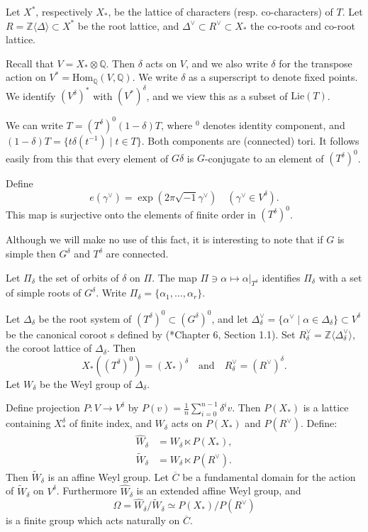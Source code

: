 \documentclass[10pt,leqno]{article}
\newcommand{\Hom}{\text{Hom}}
\newcommand{\Lie}{\text{Lie}}
\newcommand{\Z}{\mathbb Z}
\newcommand{\Q}{\mathbb Q}
\newcommand{\ch}[1]{#1^\vee}
\newcommand\inv{^{-1}}
\newcommand\wt{\widetilde}
\newcommand\wh{\widehat}
\begin{document}
Let $X^*$, respectively $X_*$, be the lattice of characters (resp. co-characters) of $T$.
Let $R=\Z\langle\Delta\rangle\subset X^*$ be
the root lattice, and $\ch\Delta\subset \ch R\subset X_*$ the co-roots and co-root lattice.

Recall that $V=X_*\otimes\Q$. Then $\delta$ acts on $V$, and we also write
$\delta$ for the transpose action on $V^*=\Hom_\Q(V,\Q)$.
We write $\delta$ as a superscript to denote fixed points.
We identify $(V^\delta)^*$ with $(V^*)^\delta$, and we view this as a subset of $\Lie(T)$.

We can write $T=(T^\delta)^0(1-\delta)T$, where $\phantom{}^0$ denotes identity component,
and $(1-\delta)T=\{t\delta(t\inv)\mid t\in T\}$. Both components are (connected) tori.
It follows easily from this that every element of $G\delta$ is $G$-conjugate
to an element of $(T^\delta)^0$.

Define
\begin{equation}
\label{e:e}
e(\ch\gamma)=\exp(2\pi \sqrt{-1}\ch\gamma) \quad(\ch\gamma\in V^\delta).
\end{equation}
This map is surjective  onto the elements of finite order in $(T^\delta)^0$.

Although we will make no use of this fact, it is interesting to note that if $G$ is simple then
$G^\delta$  and $T^\delta$ are connected.

Let $\Pi_\delta$ the set of orbits of $\delta$ on $\Pi$. The map
$\Pi\ni\alpha\mapsto \alpha|_{T^{\delta}}$ identifies $\Pi_\delta$ with 
a set of simple roots of 
$G^{\delta}$. Write $\Pi_\delta=\{\alpha_1,\dots,\alpha_r\}$.

Let $\Delta_\delta$ be the root system of
$(T^{\delta})^0\subset (G^{\delta})^0$, and let
$\ch\Delta_\delta=\{\ch\alpha\mid \alpha\in\Delta_\delta\}\subset
V^\delta$ be the canonical coroot
s defined by
(\cite{bourbaki_4-6}*{Chapter 6, Section 1.1}).
Set $\ch R_\delta=\Z\langle\ch\Delta_\delta\rangle$, the coroot lattice of $\Delta_\delta$.
Then
$$
X_*((T^{\delta})^0)=(X_*)^\delta\quad\text{and}\quad \ch R_\delta=(\ch R)^\delta.
$$
Let $W_\delta$ be the Weyl group of $\Delta_\delta$.

Define projection $P:V\rightarrow V^\delta$ by
$P(v)=\frac1n \sum_{i=0}^{n-1}\delta^iv$.
Then $P(X_*)$ is a lattice containing $X_*^\delta$ of finite index,
and $W_\delta$ acts on $P(X_*)$ and $P(\ch R)$. Define:
\begin{equation}
\label{e:affine}
\begin{aligned}
\wh W_\delta&=W_\delta\ltimes P(X_*), \\
\wt W_\delta&=W_\delta\ltimes P(\ch R).
\end{aligned}
\end{equation}
Then $\wt W_\delta$ is an affine Weyl group. Let $\overline C$ be a
fundamental domain for the action of $\wt W_\delta$ on $V^\delta$.
Furthermore
$\wh W_\delta$ is an extended affine Weyl group, and
$$
\Omega=\wh W_\delta/\wt W_\delta\simeq P(X_*)/P(\ch R)
$$
is a finite group which acts naturally on $\overline C$.
\end{document}
